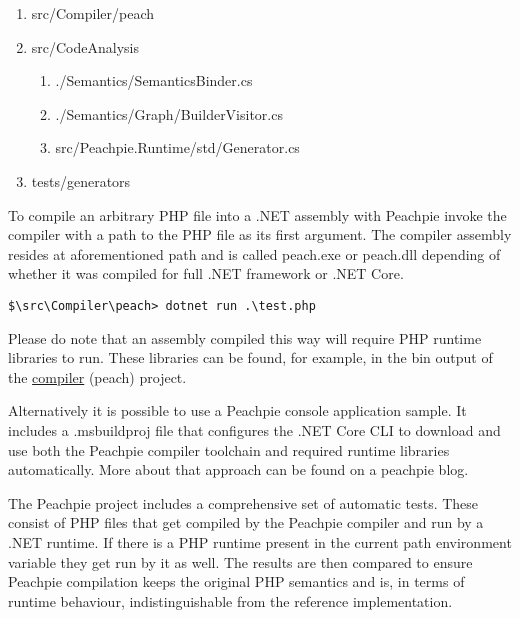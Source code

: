 \begin{enumerate}
	\item \label{peach}src/Compiler/peach	
	\item src/CodeAnalysis
	\begin{enumerate}
		\item ./Semantics/SemanticsBinder.cs
		\item ./Semantics/Graph/BuilderVisitor.cs
		\item src/Peachpie.Runtime/std/Generator.cs
	\end{enumerate}
	\item tests/generators
\end{enumerate}

To compile an arbitrary PHP file into a .NET assembly with Peachpie invoke the compiler with a path to the PHP file as its first argument. The compiler assembly resides at aforementioned path and is called peach.exe or peach.dll depending of whether it was compiled for full .NET framework or .NET Core.

\begin{verbatim}
$\src\Compiler\peach> dotnet run .\test.php
\end{verbatim}

Please do note that an assembly compiled this way will require PHP runtime libraries to run. These libraries can be found, for example, in the bin output of the \hyperref[peach]{compiler} (peach) project.

Alternatively it is possible to use a Peachpie console application sample\footnotemark. It includes a .msbuildproj file that configures the .NET Core CLI to download and use both the Peachpie compiler toolchain and required runtime libraries automatically. 
More about that approach can be found on a peachpie blog\footnotemark.




The Peachpie project includes a comprehensive set of automatic tests. These consist of PHP files that get compiled by the Peachpie compiler and run by a .NET runtime. If there is a PHP runtime present in the current path environment variable they get run by it as well. The results are then compared to ensure Peachpie compilation keeps the original PHP semantics and is, in terms of runtime behaviour, indistinguishable from the reference implementation.

